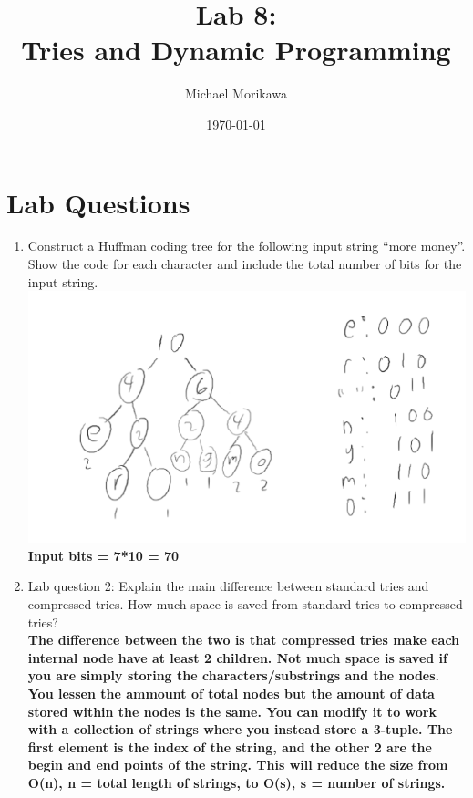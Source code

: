 \documentclass{article}
\title{Lab 8: \\ Tries and Dynamic Programming}
\author{Michael Morikawa}
\date{\today}
\begin{document}
\maketitle
\section{Lab Questions}
\begin{enumerate}[label=\textbf{Question \arabic*}]
      \item  Construct a Huffman coding tree for the following input string “more
            money”. Show the code for each character and include the total number of bits for the
            input string. \\
            \includegraphics[scale=0.7]{Question_1.png} \\
            \textbf{
                  Input bits = 7*10 = 70
            }
      \item Lab question 2: Explain the main difference between standard tries and compressed
            tries. How much space is saved from standard tries to compressed tries?\\
            \textbf{
                  The difference between the two is that compressed tries make each internal node
                  have at least 2 children. Not much space is saved if you are simply storing the characters/substrings
                  and the nodes. You lessen the ammount of total nodes but the amount of data stored within the nodes is the same.
                  You can modify it to work with a collection of strings where you instead store a 3-tuple. The first
                  element is the index of the string, and the other 2 are the begin and end points of the string. This will
                  reduce the size from O(n), n = total length of strings, to O(s), s = number of strings.
            }


\end{enumerate}
\end{document}
